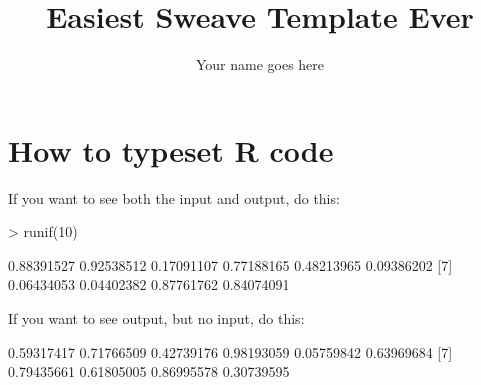 \documentclass[12pt]{article}         %
\title{Easiest Sweave Template Ever}  %
\author{Your name goes here}          %
\begin{document}




\maketitle              %

\section{How to typeset \textsf{R} code}

If you want to see both the input and output, do this:

\begin{Schunk}
\begin{Sinput}
> runif(10)
\end{Sinput}
\begin{Soutput}
 [1] 0.88391527 0.92538512 0.17091107 0.77188165 0.48213965 0.09386202
 [7] 0.06434053 0.04402382 0.87761762 0.84074091
\end{Soutput}
\end{Schunk}

If you want to see output, but no input, do this:

\begin{Schunk}
\begin{Soutput}
 [1] 0.59317417 0.71766509 0.42739176 0.98193059 0.05759842 0.63969684
 [7] 0.79435661 0.61805005 0.86995578 0.30739595
\end{Soutput}
\end{Schunk}
\end{document}
